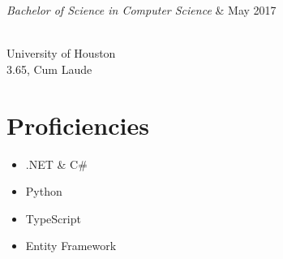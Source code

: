 \documentclass{res}
\begin{document}
{\begin{resume}
\begin{ncolumn}{2}
  {\it Bachelor of Science in Computer Science}  &   {\hspace*{\fill} May 2017}
\end{ncolumn}\\
University of Houston\\
3.65, Cum Laude

\section{\bf Proficiencies}
\begin{itemize}[noitemsep]
  \item .NET \& C\#
  \item Python
  \item TypeScript
  \item Entity Framework
\end{itemize}

\end{resume}

\vfill}
\end{document}
